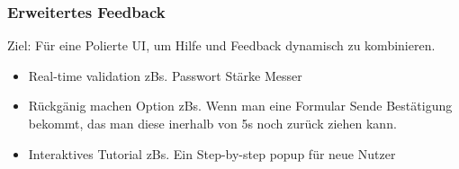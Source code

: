 \documentclass[10pt]{article}
\begin{document}
	\subsubsection{Erweitertes Feedback}
	
	Ziel: Für eine Polierte UI, um Hilfe und Feedback dynamisch zu kombinieren.
	
	\begin{itemize} 
		\item Real-time validation
			\subitem zBs. Passwort Stärke Messer
		\item Rückgänig machen Option
			\subitem zBs. Wenn man eine Formular Sende Bestätigung bekommt, das man diese inerhalb von 5s noch zurück ziehen kann.
		\item Interaktives Tutorial
			\subitem zBs. Ein Step-by-step popup für neue Nutzer
	\end{itemize}
\end{document}
